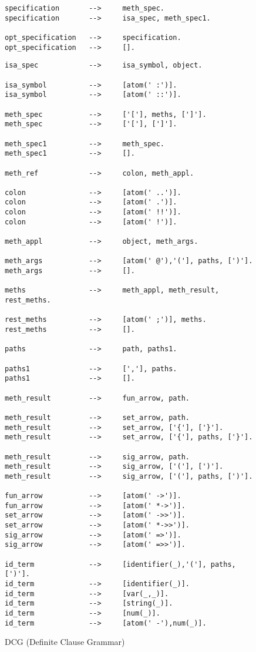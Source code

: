 \begin{figure}[htbp]
\begin{minipage}[t]{.48\textwidth}
{\begin{verbatim}
specification       -->     meth_spec.
specification       -->     isa_spec, meth_spec1.

opt_specification   -->     specification.
opt_specification   -->     [].
\end{verbatim}}
\end{minipage}
\begin{minipage}[t]{.48\textwidth}
{\scriptsize
\begin{verbatim}
isa_spec            -->     isa_symbol, object.

isa_symbol          -->     [atom(' :')].
isa_symbol          -->     [atom(' ::')].

meth_spec           -->     ['['], meths, [']'].
meth_spec           -->     ['['], [']'].

meth_spec1          -->     meth_spec.
meth_spec1          -->     [].

meth_ref            -->     colon, meth_appl.

colon               -->     [atom(' ..')].
colon               -->     [atom(' .')].
colon               -->     [atom(' !!')].
colon               -->     [atom(' !')].

meth_appl           -->     object, meth_args.

meth_args           -->     [atom(' @'),'('], paths, [')'].
meth_args           -->     [].

meths               -->     meth_appl, meth_result, rest_meths.

rest_meths          -->     [atom(' ;')], meths.
rest_meths          -->     [].

paths               -->     path, paths1.
                                
paths1              -->     [','], paths.    
paths1              -->     [].

meth_result         -->     fun_arrow, path.

meth_result         -->     set_arrow, path.
meth_result         -->     set_arrow, ['{'], ['}'].
meth_result         -->     set_arrow, ['{'], paths, ['}'].

meth_result         -->     sig_arrow, path.
meth_result         -->     sig_arrow, ['('], [')'].
meth_result         -->     sig_arrow, ['('], paths, [')'].

fun_arrow           -->     [atom(' ->')].   
fun_arrow           -->     [atom(' *->')].   
set_arrow           -->     [atom(' ->>')].    
set_arrow           -->     [atom(' *->>')].
sig_arrow           -->     [atom(' =>')].        
sig_arrow           -->     [atom(' =>>')].    

id_term             -->     [identifier(_),'('], paths, [')'].
id_term             -->     [identifier(_)].
id_term             -->     [var(_,_)].
id_term             -->     [string(_)].
id_term             -->     [num(_)].
id_term             -->     [atom(' -'),num(_)].
\end{verbatim}}
\end{minipage}
\caption{\FLIP DCG (Definite Clause Grammar)}
\label{fig-flip-dcg}
\end{figure}



